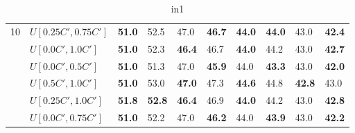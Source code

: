 \begin{table}[h]
{\begin{tabular}{|l|l||l|l||l|l||l|l||l|l|}
      \hline\hline
      \multirow{6}{*}{10}
       & $U[0.25C',0.75C']$ & \textbf{51.0} & 52.5 		& 47.0 & \textbf{46.7} 		& \textbf{44.0} & \textbf{44.0} 		& 43.0 & \textbf{42.4}\\
       & $U[0.0C',1.0C']$ & \textbf{51.0} & 52.3 			& \textbf{46.4} & 46.7 		& \textbf{44.0} & 44.2 		& 43.0 & \textbf{42.7}\\
       & $U[0.0C',0.5C']$ & \textbf{51.0} & 51.3 			& 47.0 & \textbf{45.9} 		& 44.0 & \textbf{43.3} 		& 43.0 & \textbf{42.0}\\
       & $U[0.5C',1.0C']$ & \textbf{51.0} & 53.0 			& \textbf{47.0} & 47.3 		& \textbf{44.6} & 44.8 		& \textbf{42.8} & 43.0\\
       & $U[0.25C',1.0C']$ & \textbf{51.8} & \textbf{52.8} & \textbf{46.4} & 46.9 	& \textbf{44.0} & 44.2 		& 43.0 & \textbf{42.8}\\
       & $U[0.0C',0.75C']$ & \textbf{51.0} & 52.2 			& 47.0 & \textbf{46.2} 		& 44.0 & \textbf{43.9} 		& 43.0 & \textbf{42.2}\\
      \hline
      \end{tabular}
      }
      \caption{in1}
      \label{tab:inCompared}\end{table}
